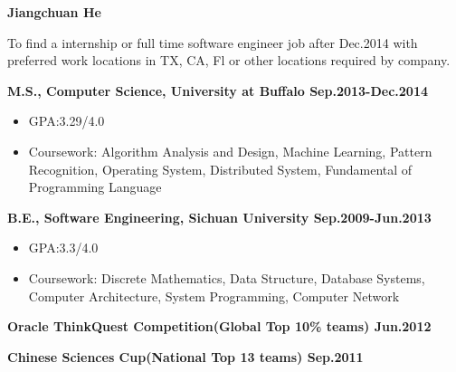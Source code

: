 \documentclass{myres}
\begin{document}
{\LARGE \bf Jiangchuan He}
\myline

{

}

{
	To find a internship or full time software engineer job after Dec.2014 with preferred work locations in
	TX, CA, Fl or other locations required by company.
}
{\textbf{M.S., Computer Science, University at Buffalo \hfill Sep.2013-Dec.2014} 		
\begin{itemize}[topsep=0pt, leftmargin=0.2in] \itemsep -5pt
	\item[]GPA:3.29/4.0
	\item[]Coursework: Algorithm Analysis and Design, Machine Learning, Pattern Recognition, Operating System, Distributed System,
		Fundamental of Programming Language
\end{itemize}
\par
\smallskip
\textbf{B.E., Software Engineering, Sichuan University \hfill Sep.2009-Jun.2013} 		
\begin{itemize}[topsep=0pt, leftmargin=0.2in] \itemsep -5pt
	\item[]GPA:3.3/4.0
	\item[]Coursework: Discrete Mathematics, Data Structure, Database Systems, Computer Architecture, System Programming,
		Computer Network
\end{itemize}

}
{
	\textbf{Oracle ThinkQuest Competition(Global Top 10\% teams) \hfill  Jun.2012}
	\par
 	\textbf{Chinese Sciences Cup(National Top 13 teams) \hfill Sep.2011}
}
\end{document}
